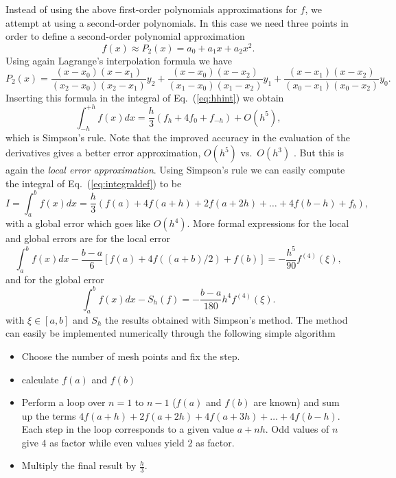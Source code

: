 Instead of using the above first-order polynomials 
approximations for $f$, we attempt at using a second-order polynomials.
In this case we need three points in order to define a second-order 
polynomial approximation
\[
f(x) \approx P_2(x)=a_0+a_1x+a_2x^2.
\]
Using again Lagrange's interpolation formula we have
\[
     P_2(x)=\frac{(x-x_0)(x-x_1)}{(x_2-x_0)(x_2-x_1)}y_2+
            \frac{(x-x_0)(x-x_2)}{(x_1-x_0)(x_1-x_2)}y_1+
            \frac{(x-x_1)(x-x_2)}{(x_0-x_1)(x_0-x_2)}y_0.
\]
Inserting this formula in the integral of Eq.\ (\ref{eq:hhint}) we obtain
\[
   \int_{-h}^{+h}f(x)dx=\frac{h}{3}\left(f_h + 4f_0 + f_{-h}\right)+O(h^5),
\]
which is Simpson's rule. Note that the improved accuracy in the evaluation of
the derivatives gives a better error approximation, $O(h^5)$ vs.\ $O(h^3)$ .
But this is again the {\em local error approximation}. 
Using Simpson's rule we can easily compute
the integral     of Eq.\ (\ref{eq:integraldef}) to be
\begin{equation}
   I=\int_a^bf(x) dx=\frac{h}{3}\left(f(a) + 4f(a+h) +2f(a+2h)+
                          \dots +4f(b-h)+ f_{b}\right),
   \label{eq:simpson}
\end{equation}
with a global error which goes like $O(h^4)$. 
More formal expressions for the local and global errors are for the local error
\[
\int_a^bf(x)dx -\frac{b-a}{6}\left[f(a)+4f((a+b)/2)+f(b)\right]=-\frac{h^5}{90}f^{(4)}(\xi),
\]
and for the global error
\[
\int_a^bf(x)dx -S_h(f)=-\frac{b-a}{180}h^4f^{(4)}(\xi).
\]
with $\xi\in[a,b]$ and $S_h$ the results obtained with Simpson's method.
The method 
can easily be implemented numerically through the following simple algorithm
\begin{svgraybox}
\begin{itemize}
   \item Choose the number of mesh points and fix the step.
   \item calculate $f(a)$ and $f(b)$
   \item Perform a loop over $n=1$ to $n-1$ ($f(a)$ and $f(b)$ are known) and sum up
         the terms $4f(a+h) +2f(a+2h)+4f(a+3h)+\dots +4f(b-h)$. Each step in the loop
         corresponds to a given value $a+nh$. Odd values of $n$ give $4$ as factor
         while even values yield $2$ as factor. 
   \item Multiply the final result by $\frac{h}{3}$.
\end{itemize}\end{svgraybox}


